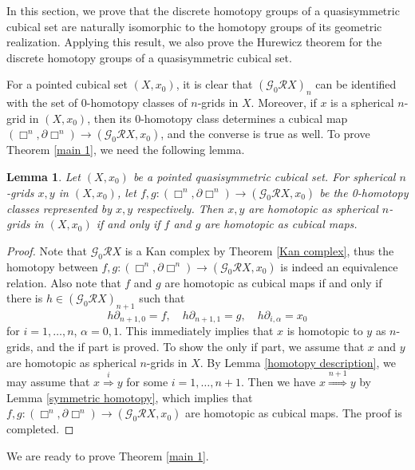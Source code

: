 \documentclass[oneside, 12pt]{amsart}
\numberwithin{equation}{section}
\theoremstyle{plain}
\newtheorem{theorem}{Theorem}[section]
\newtheorem{lemma}[theorem]{Lemma}
\theoremstyle{definition}
\theoremstyle{remark}
\begin{document}
	In this section, we prove that the discrete homotopy groups of a quasisymmetric cubical set are naturally isomorphic to the homotopy groups of its geometric realization. Applying this result, we also prove the Hurewicz theorem for the discrete homotopy groups of a quasisymmetric cubical set.
	
	
	For a pointed cubical set $(X,x_0)$, it is clear that $(\mathcal{G}_0\mathcal{R}X)_n$ can be identified with the set of 0-homotopy classes of $n$-grids in $X$. Moreover, if $x$ is a spherical $n$-grid in $(X,x_0)$, then its 0-homotopy class determines a cubical map $(\Box^n,\partial\Box^n)\to(\mathcal{G}_0\mathcal{R}X,x_0)$, and the converse is true as well. To prove Theorem \ref{main 1}, we need the following lemma.
	\begin{lemma}
		\label{homotopy of grids vs homotopy of cubical maps}
		Let $(X,x_0)$ be a pointed quasisymmetric cubical set. For spherical $n$-grids $x,y$ in $(X,x_0)$, let $f,g\colon(\Box^n,\partial\Box^n)\to(\mathcal{G}_0\mathcal{R}X,x_0)$ be the 0-homotopy classes represented by $x,y$ respectively. Then $x,y$ are homotopic as spherical $n$-grids in $(X,x_0)$ if and only if $f$ and $g$ are homotopic as cubical maps.
	\end{lemma}
	\begin{proof}
		Note that $\mathcal{G}_0\mathcal{R}X$ is a Kan complex by Theorem \ref{Kan complex}, thus the homotopy between $f,g\colon(\Box^n,\partial\Box^n)\to(\mathcal{G}_0\mathcal{R}X,x_0)$ is indeed an equivalence relation. Also note that $f$ and $g$ are homotopic as cubical maps if and only if there is $h\in(\mathcal{G}_0\mathcal{R}X)_{n+1}$ such that
		\[
		h\partial_{n+1,0}=f,\quad h\partial_{n+1,1}=g,\quad h\partial_{i,\alpha}=x_0
		\]
		for $i=1,\ldots,n$, $\alpha=0,1$. This immediately implies that $x$ is homotopic to $y$ as $n$-grids, and the if part is proved. To show the only if part, we assume that $x$ and $y$ are homotopic as spherical $n$-grids in $X$. By Lemma \ref{homotopy description}, we may assume that $x\overset{i}{\Rightarrow}y$ for some $i=1,\ldots,n+1$. Then we have $x\overset{n+1}{\Rightarrow}y$ by Lemma \ref{symmetric homotopy}, which implies that $f,g\colon(\Box^n,\partial\Box^n)\to(\mathcal{G}_0\mathcal{R}X,x_0)$ are homotopic as cubical maps. The proof is completed.
	\end{proof}
	We are ready to prove Theorem \ref{main 1}.
	
\end{document}
